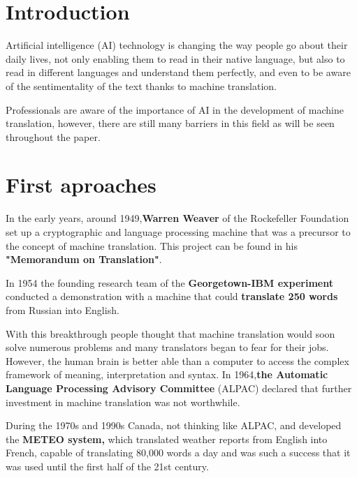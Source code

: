 \documentclass[a4paper]{article}
\theoremstyle{plain}
\theoremstyle{definition}
\begin{document}
	\newpage
	
	\tableofcontents
	\newpage
	\section{Introduction}
	\label{sec:intro}
	Artificial intelligence (AI) technology is changing the way people go about their daily lives, not only enabling them to read in their native language, but also to read in different languages and understand them perfectly, and even to be aware of the sentimentality of the text thanks to machine translation.\newline

    Professionals are aware of the importance of AI in the development of machine translation, however, there are still many barriers in this field as will be seen throughout the paper.


	
	
    
	
	


	
	
	\section{First aproaches}
	\label{sec:examples}
    In the early years, around 1949,\textbf{Warren Weaver}  of the Rockefeller Foundation set up a cryptographic and language processing machine that was a precursor to the concept of machine translation. This project can be found in his \textbf{"Memorandum on Translation"}.\newline
    
    In 1954 the founding research team of the \textbf{Georgetown-IBM experiment} conducted a demonstration with a machine that could \textbf{translate 250 words} from Russian into English.\newline
    
    With this breakthrough people thought that machine translation would soon solve numerous problems and many translators began to fear for their jobs. However, the human brain is better able than a computer to access the complex framework of meaning, interpretation and syntax. In 1964,\textbf{the Automatic Language Processing Advisory Committee}  (ALPAC) declared that further investment in machine translation was not worthwhile.\newline
    
    During the 1970s and 1990s Canada, not thinking like ALPAC, and developed the \textbf{METEO system,} which translated weather reports from English into French, capable of translating 80,000 words a day and was such a success that it was used until the first half of the 21st century.\newline
    
\end{document}
